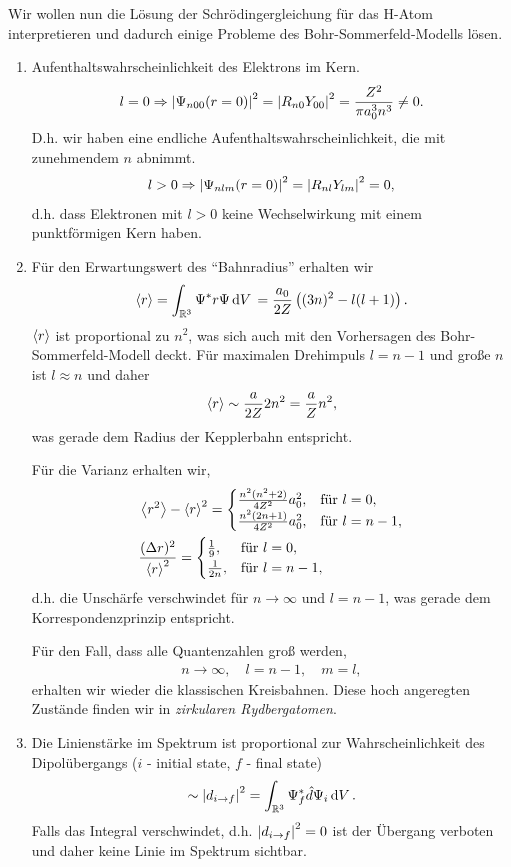 Wir wollen nun die Lösung der Schrödingergleichung für das H-Atom
interpretieren und dadurch einige Probleme des Bohr-Sommerfeld-Modells
lösen.

\begin{enumerate}[label=\arabic{*}.)]
\item Aufenthaltswahrscheinlichkeit des Elektrons im Kern.
\begin{align*}
l=0 \Rightarrow
\left|\Psi_{n00}(r=0)\right|^2 = \left|R_{n0}Y_{00}\right|^2 = \frac{Z^2}{\pi a_0^3n^3} \neq
0.
\end{align*}
D.h. wir haben eine endliche Aufenthaltswahrscheinlichkeit, die mit zunehmendem
$n$ abnimmt.
\begin{align*}
l>0\Rightarrow
\left|\Psi_{nlm}(r=0)\right|^2 = \left|R_{nl}Y_{lm}\right|^2 = 0,
\end{align*}
d.h. dass Elektronen mit $l>0$ keine Wechselwirkung mit einem punktförmigen Kern
haben.
\item Für den Erwartungswert des ``Bahnradius'' erhalten wir
\begin{align*}
\left\langle r\right\rangle = \int_{\mathbb{R}^3}\Psi^*r\Psi \,\mathrm{d} V\, = \frac{a_0}{2Z}\left((3n)^2 -l(l+1)
\right).
\end{align*}
$\left\langle r\right\rangle$ ist proportional zu $n^2$, was sich auch mit den Vorhersagen des
Bohr-Sommerfeld-Modell deckt. Für maximalen Drehimpuls $l=n-1$ und große
$n$ ist $l\approx n$ und daher
\begin{align*}
\left\langle r\right\rangle \sim \frac{a}{2Z}2n^2 = \frac{a}{Z}n^2,
\end{align*}
was gerade dem Radius der Kepplerbahn entspricht.

Für die Varianz erhalten wir,
\begin{align*}
&\left\langle r^2\right\rangle-\left\langle r\right\rangle^2 =
\begin{cases}
\frac{n^2(n^2+2)}{4Z^2} a_0^2, & \text{für }l=0,\\
\frac{n^2(2n+1)}{4Z^2} a_0^2, & \text{für }l=n-1,
\end{cases}\\
&\frac{(\Delta r)^2}{\left\langle r\right\rangle^2} =
\begin{cases}
\frac{1}{9}, & \text{für }l=0,\\
\frac{1}{2n}, & \text{für }l=n-1, 
\end{cases}
\end{align*}
d.h. die Unschärfe verschwindet für $n\to\infty$ und $l=n-1$, was gerade dem
Korrespondenzprinzip entspricht.

Für den Fall, dass alle Quantenzahlen groß werden,
\begin{align*}
n\to\infty,\quad l = n-1,\quad m=l,
\end{align*}
erhalten wir wieder die klassischen Kreisbahnen. Diese hoch angeregten Zustände
finden wir in \emph{zirkularen Rydbergatomen}.
\item Die Linienstärke im Spektrum ist proportional zur Wahrscheinlichkeit des
Dipolübergangs ($i$ - initial state, $f$ - final state)
\begin{align*}
\sim \left|d_{i\to f}\right|^2 = \int_{\mathbb{R}^3} \Psi_f^* \hat{\boldmath{d}} \Psi_i \,\mathrm{d} V\,.
\end{align*}
Falls das Integral verschwindet, d.h. $\left|d_{i\to f}\right|^2 = 0$ ist der Übergang
verboten und daher keine Linie im Spektrum sichtbar.


\end{enumerate}
